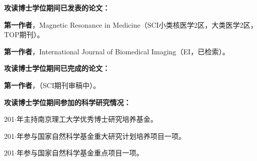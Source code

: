 \begin{publications}{99}
\item[] {\songti{}\bf{攻读博士学位期间已发表的论文：}}
\item \textbf{第一作者}，Magnetic Resonance in Medicine（SCI小类核医学2区，大类医学2区，TOP期刊）。
\item \textbf{第一作者}，International Journal of Biomedical Imaging（EI，已检索）。

\vspace{1.0cm}
\item[] {\songti{}\bf{攻读博士学位期间已完成的论文：}}
\setcounter{enumiv}{0}
\item \textbf{第一作者}，（SCI期刊审稿中）。

\vspace{1.0cm}
\item[] {\songti{}\bf{攻读博士学位期间参加的科学研究情况：}}
\setcounter{enumiv}{0}
\item 201$\cdot$年主持南京理工大学优秀博士研究培养基金。
\item 201$\cdot$年参与国家自然科学基金重大研究计划培养项目一项。
\item 201$\cdot$年参与国家自然科学基金重点项目一项。


%
%


\end{publications}
